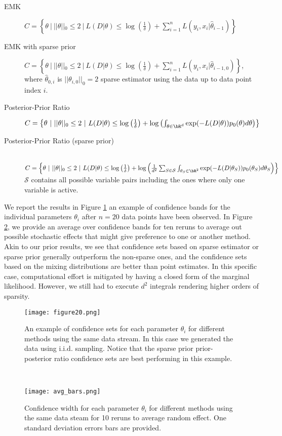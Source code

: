 \begin{description}
    \item[EMK]
     $ C = \left\{ \theta ~|~  ||\theta||_0 \leq 2 ~|~ L(D|\theta) \leq \log\left(\frac{1}{\delta}\right) + \sum_{i=1}^n L(y_i,x_i| \hat{\theta}_{i-1}) \right\} $
    \item[EMK with sparse prior]
    $ C = \left\{ \theta ~|~  ||\theta||_0 \leq 2 ~|~ L(D|\theta) \leq \log\left(\frac{1}{\delta}\right) + \sum_{i=1}^n L(y_i,x_i| \hat{\theta}_{i-1,0}) \right\} $,
    where $\hat{\theta}_{0,i}$ is $||\theta_{i,0}||_0=2$ sparse estimator using the data up to data point index $i$.
    \item[Posterior-Prior Ratio] $ C = \left\{ \theta ~|~  ||\theta||_0 \leq 2 ~|~ L(D|\theta) \leq \log\left(\frac{1}{\delta}\right) + \log\left( \int_{\theta \in \bR^d} \exp(-L(D|\theta)) p_0(\theta) d\theta\right) \right\} $
    \item[Posterior-Prior Ratio (sparse prior)] \hfill \\
    $ C = \left\{\theta ~|~ ||\theta||_0 \leq 2 ~|~ L(D|\theta) \leq \log\left(\frac{1}{\delta}\right) + \log\left(\frac{1}{d^2}\sum_{S \in \mathcal{S} } \int_{\theta_S \in \bR^2} \exp(-L(D|\theta_S)) p_0(\theta_S) d\theta_S\right) \right\} $
    $\mathcal{S}$ contains all possible variable pairs including the ones where only one variable is active. 
\end{description}

We report the results in Figure \ref{fig:sparse-models} an example of confidence bands for the individual parameters $\theta_i$ after $n=20$ data points have been observed. In Figure \ref{fig:sparse-models-avg}, we provide an average over confidence bands for ten reruns to average out possible stochastic effects that might give preference to one or another method.  Akin to our prior results, we see that confidence sets based on sparse estimator or sparse prior generally outperform the non-sparse ones, and the confidence sets based on the mixing distributions are better than point estimates. In this specific case, computational effort is mitigated by having a closed form of the marginal likelihood. However, we still had to execute $d^2$ integrals rendering higher orders of sparsity.


    \begin{figure}%
    \centering
        \texttt{[image: figure20.png]}
            \caption{An example of confidence sets for each parameter $\theta_i$ for different methods using the same data stream. In this case we generated the data using i.i.d. sampling. Notice that the sparse prior prior-posterior ratio confidence sets are best performing in this example.}
        \label{fig:sparse-models}    
    \end{figure}
~
    \begin{figure}%
        \centering
        \texttt{[image: avg\_bars.png]}
        \caption{Confidence width for each parameter $\theta_i$ for different methods using the same data steam for 10 reruns to average random effect. One standard deviation errors bars are provided.}
        \label{fig:sparse-models-avg}    
\end{figure}
